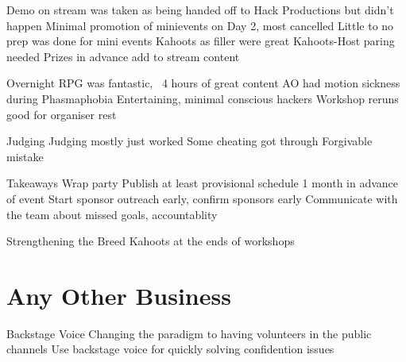\documentclass[11pt,hacksoc]{meetingmins}
\begin{document}
\begin{items}
  \subitem Demo on stream was taken as being handed off to Hack Productions but didn't happen
  \subitem Minimal promotion of minievents on Day 2, most cancelled
  \subitem Little to no prep was done for mini events
  \subitem Kahoots as filler were great
    \subsubitem Kahoots-Host paring needed
  \subitem Prizes in advance add to stream content 
\item Overnight
  \subitem RPG was fantastic, 
    \subsubitem ~4 hours of great content
  \subitem AO had motion sickness during Phasmaphobia
  \subitem Entertaining, minimal conscious hackers
  \subitem Workshop reruns good for organiser rest
\item Judging
  \subitem Judging mostly just worked
  \subitem Some cheating got through
    \subsubitem Forgivable mistake
\item Takeaways
  \subitem Wrap party
  \subitem Publish at least provisional schedule 1 month in advance of event
  \subitem Start sponsor outreach early, confirm sponsors early
  \subitem Communicate with the team about missed goals, accountablity 
\item Strengthening the Breed
  \subitem Kahoots at the ends of workshops
\end{items}

\section{Any Other Business}
\begin{items}
\item Backstage Voice
  \subitem Changing the paradigm to having volunteers in the public channels
  \subitem Use backstage voice for quickly solving confidention issues
\end{items}

\vspace{1em}
\nextmeeting{}
\end{document}
